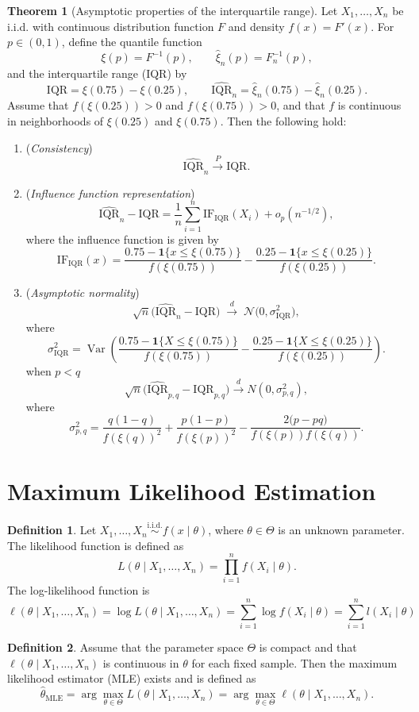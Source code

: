\documentclass[11pt]{article}
\theoremstyle{definition}
\newtheorem{defn}{Definition}[section]
\newtheorem{theo}{Theorem}[section]
\begin{document}
\begin{theo}[Asymptotic properties of the interquartile range]
Let $X_1,\dots,X_n$ be i.i.d. with continuous distribution function $F$ and density 
$f(x) = F'(x)$. For $p \in (0,1)$, define the quantile function
\[
\xi(p) = F^{-1}(p),
\qquad 
\hat{\xi}_n(p) = F_n^{-1}(p),
\]
and the interquartile range (IQR) by
\[
\mathrm{IQR} = \xi(0.75) - \xi(0.25), 
\qquad 
\widehat{\mathrm{IQR}}_n = \hat{\xi}_n(0.75) - \hat{\xi}_n(0.25).
\]
Assume that $f(\xi(0.25)) > 0$ and $f(\xi(0.75)) > 0$, and that $f$ is continuous in neighborhoods 
of $\xi(0.25)$ and $\xi(0.75)$. Then the following hold:
\begin{enumerate}
\item (\emph{Consistency}) 
\[
\widehat{\mathrm{IQR}}_n \xrightarrow{P} \mathrm{IQR}.
\]

\item (\emph{Influence function representation})
\[
\widehat{\mathrm{IQR}}_n - \mathrm{IQR}
=
\frac{1}{n} \sum_{i=1}^n \mathrm{IF}_{\mathrm{IQR}}(X_i)
+ o_p(n^{-1/2}),
\]
where the influence function is given by
\[
\mathrm{IF}_{\mathrm{IQR}}(x)
=
\frac{0.75 - \mathbf{1}\{x \le \xi(0.75)\}}{f(\xi(0.75))}
-
\frac{0.25 - \mathbf{1}\{x \le \xi(0.25)\}}{f(\xi(0.25))}.
\]

\item (\emph{Asymptotic normality})
\[
\sqrt{n}\big(\widehat{\mathrm{IQR}}_n - \mathrm{IQR}\big)
\;\xrightarrow{d}\;
\mathcal{N}\big(0, \sigma^2_{\mathrm{IQR}}\big),
\]
where
\[
\sigma^2_{\mathrm{IQR}}
=
\operatorname{Var}\!\left(
\frac{0.75 - \mathbf{1}\{X \le \xi(0.75)\}}{f(\xi(0.75))}
-
\frac{0.25 - \mathbf{1}\{X \le \xi(0.25)\}}{f(\xi(0.25))}
\right).
\]
when $p < q$
\[
\sqrt{n}\Big(\widehat{\mathrm{IQR}}_{p,q} - \mathrm{IQR}_{p,q}\Big)
\xrightarrow{d}
N(0, \sigma^2_{p,q}),
\]
where
\[
\sigma^2_{p,q}
=
\frac{q(1-q)}{f(\xi(q))^2}
+
\frac{p(1-p)}{f(\xi(p))^2}
-
\frac{2\big(p - pq\big)}{f(\xi(p)) f(\xi(q))}.
\]

\end{enumerate}
\end{theo}
\newpage
\section{Maximum Likelihood Estimation}
\begin{defn}
    Let \(X_1, \dots, X_n \overset{\text{i.i.d.}}{\sim} f(x \mid \theta)\), where \(\theta \in \Theta\) is an unknown parameter.
The likelihood function is defined as
\[
L(\theta \mid X_1, \dots, X_n)
= \prod_{i=1}^n f(X_i \mid \theta).
\]
The log-likelihood function is
\[
\ell(\theta \mid X_1, \dots, X_n)
= \log L(\theta \mid X_1, \dots, X_n)
= \sum_{i=1}^n \log f(X_i \mid \theta) = \sum_{i=1}^n l(X_i \mid \theta)
\]
\end{defn}
\begin{defn}
    Assume that the parameter space \(\Theta\) is compact and that
\(\ell(\theta \mid X_1, \dots, X_n)\) is continuous in \(\theta\) for each fixed sample.
Then the maximum likelihood estimator (MLE) exists and is defined as
\[
\hat{\theta}_{\mathrm{MLE}}
= \arg\max_{\theta \in \Theta} L(\theta \mid X_1, \dots, X_n)
= \arg\max_{\theta \in \Theta} \ell(\theta \mid X_1, \dots, X_n).
\]
\end{defn}
\end{document}
